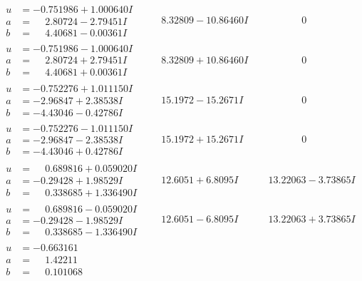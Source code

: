 \documentclass[1p]{elsarticle_modified}
\theoremstyle{definition}
\begin{document}
$$\begin{array}{c|c|c}
\begin{aligned}
u &= -0.751986 + 1.000640 I \\
a &= \phantom{-}2.80724 - 2.79451 I \\
b &= \phantom{-}4.40681 - 0.00361 I\end{aligned}
 & \phantom{-}8.32809 - 10.86460 I & \phantom{-0.000000 } 0 \\ \hline\begin{aligned}
u &= -0.751986 - 1.000640 I \\
a &= \phantom{-}2.80724 + 2.79451 I \\
b &= \phantom{-}4.40681 + 0.00361 I\end{aligned}
 & \phantom{-}8.32809 + 10.86460 I & \phantom{-0.000000 } 0 \\ \hline\begin{aligned}
u &= -0.752276 + 1.011150 I \\
a &= -2.96847 + 2.38538 I \\
b &= -4.43046 - 0.42786 I\end{aligned}
 & \phantom{-}15.1972 - 15.2671 I & \phantom{-0.000000 } 0 \\ \hline\begin{aligned}
u &= -0.752276 - 1.011150 I \\
a &= -2.96847 - 2.38538 I \\
b &= -4.43046 + 0.42786 I\end{aligned}
 & \phantom{-}15.1972 + 15.2671 I & \phantom{-0.000000 } 0 \\ \hline\begin{aligned}
u &= \phantom{-}0.689816 + 0.059020 I \\
a &= -0.29428 + 1.98529 I \\
b &= \phantom{-}0.338685 + 1.336490 I\end{aligned}
 & \phantom{-}12.6051 + 6.8095 I & \phantom{-}13.22063 - 3.73865 I \\ \hline\begin{aligned}
u &= \phantom{-}0.689816 - 0.059020 I \\
a &= -0.29428 - 1.98529 I \\
b &= \phantom{-}0.338685 - 1.336490 I\end{aligned}
 & \phantom{-}12.6051 - 6.8095 I & \phantom{-}13.22063 + 3.73865 I \\ \hline\begin{aligned}
u &= -0.663161\phantom{ +0.000000I} \\
a &= \phantom{-}1.42211\phantom{ +0.000000I} \\
b &= \phantom{-}0.101068\phantom{ +0.000000I}\end{aligned}

\end{array}$$
\end{document}
